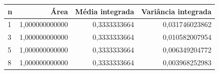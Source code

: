 \begin{tabular}{lrrr}
\toprule
n & Área & Média integrada & Variância integrada \\
\midrule
1 & 1,000000000000 & 0,3333333664 & 0,031746023862 \\
3 & 1,000000000000 & 0,3333333664 & 0,010582007954 \\
5 & 1,000000000000 & 0,3333333664 & 0,006349204772 \\
8 & 1,000000000000 & 0,3333333664 & 0,003968252983 \\
\bottomrule
\end{tabular}
